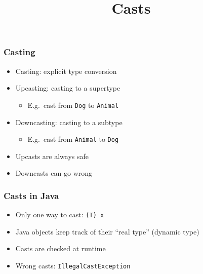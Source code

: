 
\usetikzlibrary{shadows,shapes.multipart}

\title{Casts}


\lstset{language=c++14}




\begin{frame}
  \titlepage
\end{frame}

\begin{frame}
  \frametitle{Casting}
  \begin{itemize}
    \item Casting: explicit type conversion
    \item Upcasting: casting to a supertype
          \begin{itemize}
            \item E.g.\ cast from {\tt Dog} to {\tt Animal}
          \end{itemize}
    \item Downcasting: casting to a subtype
          \begin{itemize}
            \item E.g.\ cast from {\tt Animal} to {\tt Dog}
          \end{itemize}
    \item Upcasts are always safe
    \item Downcasts can go wrong
  \end{itemize}
\end{frame}

\begin{frame}
  \frametitle{Casts in Java}
  \begin{itemize}
    \item Only one way to cast: {\tt (T) x}
    \item Java objects keep track of their ``real type'' (dynamic type)
    \item Casts are checked at runtime
    \item Wrong casts: {\tt IllegalCastException}
  \end{itemize}
\end{frame}

